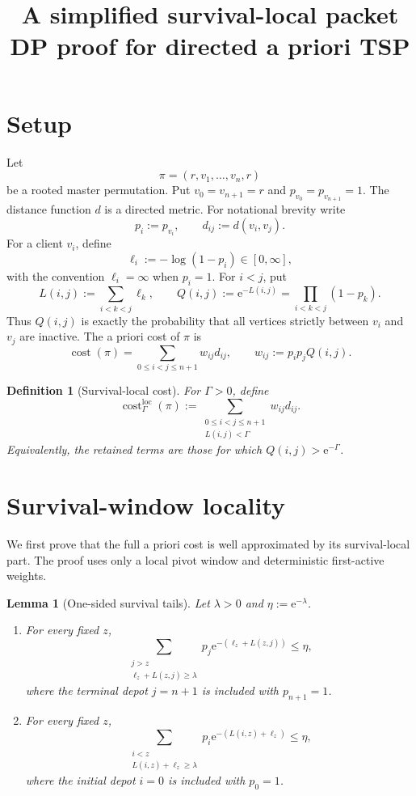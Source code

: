 \documentclass[11pt]{article}
\title{A simplified survival-local packet DP proof for directed a priori TSP}
\author{}
\date{}
\newtheorem{lemma}{Lemma}
\newtheorem{definition}{Definition}
\newcommand{\cost}{\operatorname{cost}}
\newcommand{\loc}{\operatorname{loc}}
\newcommand{\e}{\mathrm e}
\begin{document}
\maketitle

\section{Setup}

Let
\[
    \pi=(r,v_1,\dots,v_n,r)
\]
be a rooted master permutation.  Put $v_0=v_{n+1}=r$ and
$p_{v_0}=p_{v_{n+1}}=1$.  The distance function $d$ is a directed metric.  For
notational brevity write
\[
    p_i:=p_{v_i},
    \qquad
    d_{ij}:=d(v_i,v_j).
\]
For a client $v_i$, define
\[
    \ell_i:=-\log(1-p_i)\in[0,\infty],
\]
with the convention $\ell_i=\infty$ when $p_i=1$.  For $i<j$, put
\[
    L(i,j):=\sum_{i<k<j}\ell_k,
    \qquad
    Q(i,j):=\e^{-L(i,j)}=\prod_{i<k<j}(1-p_k).
\]
Thus $Q(i,j)$ is exactly the probability that all vertices strictly between
$v_i$ and $v_j$ are inactive.  The a priori cost of $\pi$ is
\[
    \cost(\pi)
    =
    \sum_{0\le i<j\le n+1}w_{ij}d_{ij},
    \qquad
    w_{ij}:=p_i p_j Q(i,j).
\]

\begin{definition}[Survival-local cost]
For $\Gamma>0$, define
\[
    \cost^{\loc}_{\Gamma}(\pi)
    :=
    \sum_{\substack{0\le i<j\le n+1\\ L(i,j)<\Gamma}}
    w_{ij}d_{ij}.
\]
Equivalently, the retained terms are those for which
$Q(i,j)>\e^{-\Gamma}$.
\end{definition}

\section{Survival-window locality}

We first prove that the full a priori cost is well approximated by its
survival-local part.  The proof uses only a local pivot window and deterministic
first-active weights.

\begin{lemma}[One-sided survival tails]\label{lem:survival-tail}
Let $\lambda>0$ and $\eta:=\e^{-\lambda}$.
\begin{enumerate}[label=(\roman*)]
\item For every fixed $z$,
\[
    \sum_{\substack{j>z\\ \ell_z+L(z,j)\ge\lambda}}
    p_j\e^{-(\ell_z+L(z,j))}
    \le \eta,
\]
where the terminal depot $j=n+1$ is included with $p_{n+1}=1$.

\item For every fixed $z$,
\[
    \sum_{\substack{i<z\\ L(i,z)+\ell_z\ge\lambda}}
    p_i\e^{-(L(i,z)+\ell_z)}
    \le \eta,
\]
where the initial depot $i=0$ is included with $p_0=1$.
\end{enumerate}
\end{lemma}
\end{document}

